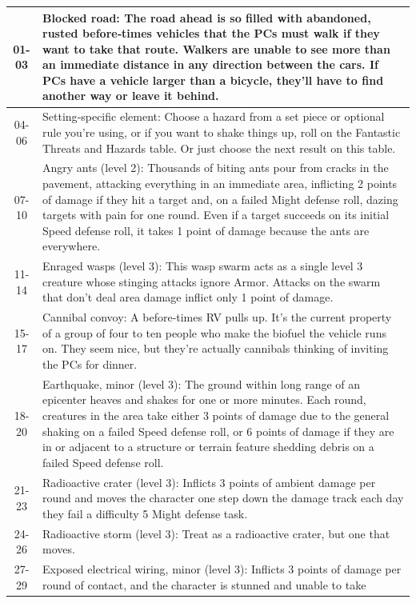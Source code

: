 \begin{longtable}{| c | p{15cm} |}
01-03 &
Blocked road: The road ahead is so filled
with abandoned, rusted before‑times vehicles that
the PCs must walk if they want to take that route.
Walkers are unable to see more than an immediate
distance in any direction between the cars. If PCs
have a vehicle larger than a bicycle, they’ll have to
find another way or leave it behind. \\ \hline
04-06 &
Setting‑specific element: Choose a hazard
from a set piece or optional rule you’re using, or if
you want to shake things up, roll on the Fantastic
Threats and Hazards table. Or just choose the next
result on this table. \\ \hline
07-10 &
Angry ants (level 2): Thousands of biting
ants pour from cracks in the pavement, attacking
everything in an immediate area, inflicting 2 points
of damage if they hit a target and, on a failed Might
defense roll, dazing targets with pain for one round.
Even if a target succeeds on its initial Speed defense
roll, it takes 1 point of damage because the ants are
everywhere. \\ \hline
11-14 &
Enraged wasps (level 3): This wasp swarm acts
as a single level 3 creature whose stinging attacks
ignore Armor. Attacks on the swarm that don’t deal
area damage inflict only 1 point of damage. \\ \hline
15-17 &
Cannibal convoy: A before‑times RV pulls
up. It’s the current property of a group of four to
ten people who make the biofuel the vehicle runs
on. They seem nice, but they’re actually cannibals
thinking of inviting the PCs for dinner. \\ \hline
18-20 &
Earthquake, minor (level 3): The ground
within long range of an epicenter heaves and shakes
for one or more minutes. Each round, creatures in
the area take either 3 points of damage due to the
general shaking on a failed Speed defense roll, or
6 points of damage if they are in or adjacent to a
structure or terrain feature shedding debris on a
failed Speed defense roll. \\ \hline
21-23 &
Radioactive crater (level 3): Inflicts 3 points
of ambient damage per round and moves the
character one step down the damage track each day
they fail a difficulty 5 Might defense task. \\ \hline
24-26 &
Radioactive storm (level 3): Treat as a
radioactive crater, but one that moves. \\ \hline
27-29 &
Exposed electrical wiring, minor (level 3):
Inflicts 3 points of damage per round of contact,
and the character is stunned and unable to take

\end{longtable}

